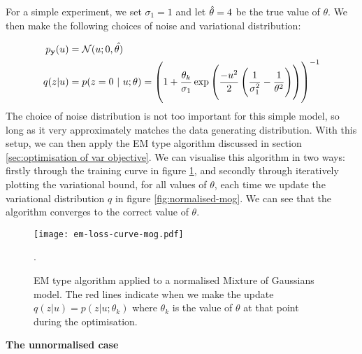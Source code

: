 \documentclass[11pt, oneside]{article}
\newcommand{\pnoise}{p_{ \mathbf y}}
\begin{document}
For a simple experiment, we set $\sigma_1 = 1$ and let $\Hat{\theta} = 4$ be the true value of $\theta$. We then make the following choices of noise and variational distribution:

\begin{align}
    \pnoise(u) &= \mathcal{N}(u; 0, \Hat{\theta)} \\
    q(z|u) &= p(z=0 \ | \ u; \theta) = \left(  1 + \frac{\theta_k}{\sigma_1} \exp \left(\frac{- u^2}{2} \left( \frac{1}{\sigma_1^2} - \frac{1}{\theta^2} \right) \right) \right)^{-1}
\end{align}
The choice of noise distribution is not too important for this simple model, so long as it very approximately matches the data generating distribution. With this setup, we can then apply the EM type algorithm discussed in section \ref{sec:optimisation of var objective}. We can visualise this algorithm in two ways: firstly through the training curve in figure \ref{fig:mog-em-loss-curve}, and secondly through iteratively plotting the variational bound, for all values of $\theta$, each time we update the variational distribution $q$ in figure \ref{fig:normalised-mog}. We can see that the algorithm converges to the correct value of $\theta$.

\begin{figure}[ht]
  \centering
  \texttt{[image: em-loss-curve-mog.pdf]}
    \caption{\label{fig:mog-em-loss-curve} EM type algorithm applied to a normalised Mixture of Gaussians model. The red lines indicate when we make the update $q(z|u) = p(z|u; \theta_k)$ where $\theta_k$ is the value of $\theta$ at that point during the optimisation.}.
\end{figure}


\newpage
\noindent \textbf{The unnormalised case}
\end{document}
